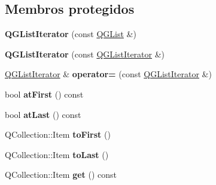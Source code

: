 \subsection*{Membros protegidos}
\begin{DoxyCompactItemize}
\item 
\hypertarget{class_q_g_list_iterator_abbeed4e955ff5b0195c88a0c39d2727d}{{\bfseries Q\-G\-List\-Iterator} (const \hyperlink{class_q_g_list}{Q\-G\-List} \&)}\label{class_q_g_list_iterator_abbeed4e955ff5b0195c88a0c39d2727d}

\item 
\hypertarget{class_q_g_list_iterator_aaf5fb89c395309a3a86fddf254fb397b}{{\bfseries Q\-G\-List\-Iterator} (const \hyperlink{class_q_g_list_iterator}{Q\-G\-List\-Iterator} \&)}\label{class_q_g_list_iterator_aaf5fb89c395309a3a86fddf254fb397b}

\item 
\hypertarget{class_q_g_list_iterator_a093ef9b7655e4590dcc4deeb3b1d5706}{\hyperlink{class_q_g_list_iterator}{Q\-G\-List\-Iterator} \& {\bfseries operator=} (const \hyperlink{class_q_g_list_iterator}{Q\-G\-List\-Iterator} \&)}\label{class_q_g_list_iterator_a093ef9b7655e4590dcc4deeb3b1d5706}

\item 
\hypertarget{class_q_g_list_iterator_a31ccd7308e8fa3fa71c847fec15eceb3}{bool {\bfseries at\-First} () const }\label{class_q_g_list_iterator_a31ccd7308e8fa3fa71c847fec15eceb3}

\item 
\hypertarget{class_q_g_list_iterator_aa158c7c7d48ef7ab1e349457aa795878}{bool {\bfseries at\-Last} () const }\label{class_q_g_list_iterator_aa158c7c7d48ef7ab1e349457aa795878}

\item 
\hypertarget{class_q_g_list_iterator_adcebe55449ce6d00c152205e52d85afe}{Q\-Collection\-::\-Item {\bfseries to\-First} ()}\label{class_q_g_list_iterator_adcebe55449ce6d00c152205e52d85afe}

\item 
\hypertarget{class_q_g_list_iterator_a498dc59cfb295c427b6488c1d7d1b1e1}{Q\-Collection\-::\-Item {\bfseries to\-Last} ()}\label{class_q_g_list_iterator_a498dc59cfb295c427b6488c1d7d1b1e1}

\item 
\hypertarget{class_q_g_list_iterator_a8980e2ae172d1c2e71f5471948fd5524}{Q\-Collection\-::\-Item {\bfseries get} () const }\label{class_q_g_list_iterator_a8980e2ae172d1c2e71f5471948fd5524}


\end{DoxyCompactItemize}
